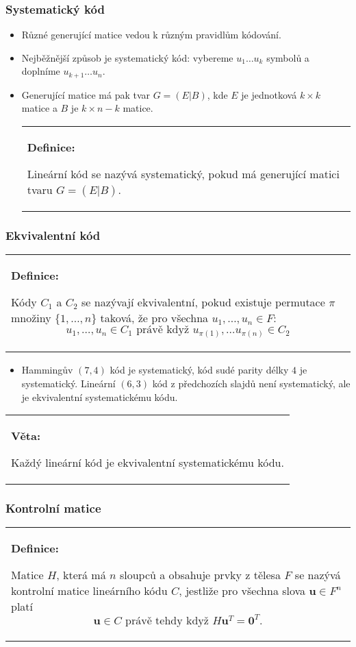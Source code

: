 \documentclass{beamer}
\newenvironment{definice}
{
    \begin{center}
    \begin{tabular}{p{9cm}}
    \textbf{Definice:}
}
{
    \end{tabular}
    \end{center}
}
\newenvironment{veta}
{
    \begin{center}
    \begin{tabular}{p{9cm}}
    \textbf{Věta:}
}
{
    \end{tabular}
    \end{center}
}
\newcommand{\vu}{\textbf{u}}
\newenvironment{itemizex}%
  {\large \begin{itemize}%
    \setlength{\itemsep}{8pt}%
    \setlength{\parskip}{8pt}}%
  {\end{itemize}}
\begin{document}
\begin{frame}[t,fragile]\frametitle{Systematický kód} 
    \begin{itemizex}
        \item Různé generující matice vedou k různým pravidlům kódování.
        \item Nejběžnější způsob je systematický kód: vybereme $u_1\dots u_k$ symbolů a doplníme $u_{k+1}\dots u_{n}$.
        \item Generující matice má pak tvar $G=(E|B)$, kde $E$ je jednotková $k\times k$ matice a $B$ je $k\times n-k$ matice. 
    \begin{definice}
    Lineární kód se nazývá systematický, pokud má generující matici tvaru $G=(E|B)$.
    \end{definice}
    \end{itemizex}
\end{frame}


\begin{frame}[t,fragile]\frametitle{Ekvivalentní kód} 
\begin{definice}
Kódy $C_1$ a $C_2$ se nazývají ekvivalentní, pokud existuje permutace $\pi$ množiny $\{1,\dots,n\}$ taková, že pro všechna $u_1,\dots,u_n\in F$:
$$
u_1,\dots,u_n\in C_1 \mbox{ právě když } u_{\pi(1)},\dots u_{\pi(n)} \in C_2
$$
\end{definice}

\begin{itemizex}
    \item Hammingův $(7,4)$ kód je systematický, kód sudé parity délky $4$ je systematický. Lineární $(6,3)$ kód z předchozích slajdů není systematický, ale je ekvivalentní systematickému kódu. 
\end{itemizex}

\begin{veta}
Každý lineární kód je ekvivalentní systematickému kódu. 
\end{veta}
\end{frame}


\begin{frame}[t,fragile]\frametitle{Kontrolní matice} 
    \begin{definice}
        Matice $H$, která má $n$ sloupců a obsahuje prvky z tělesa $F$ se nazývá kontrolní matice lineárního kódu $C$, jestliže pro všechna slova $\vu\in F^n$ platí
        $$
        \vu\in C \mbox{ právě tehdy když } H\vu^T=\textbf{0}^T.
        $$
    \end{definice}
\end{frame}
\end{document}
